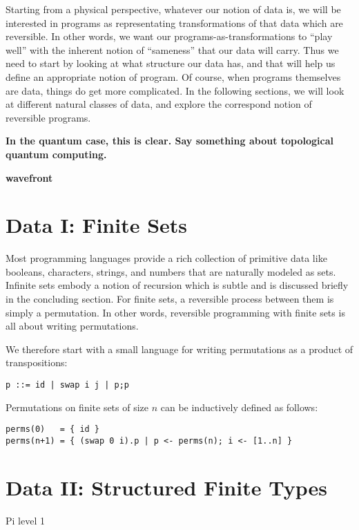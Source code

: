 \documentclass{article}
\newcommand{\amr}[1]{\fbox{Amr says:} \textbf{#1}}
\newcommand{\jc}[1]{\fbox{Jacques says:} \textbf{#1}}
\begin{document}
Starting from a physical perspective, whatever our notion of data
is, we will be interested in programs as representating transformations
of that data which are reversible. In other words, we want our
programs-as-transformations to ``play well'' with the inherent notion
of ``sameness'' that our data will carry. Thus we need to start by
looking at what structure our data has, and that will help us define
an appropriate notion of program. Of course, when programs themselves
are data, things do get more complicated.  In the following sections,
we will look at different natural classes of data, and explore the
correspond notion of reversible programs.

\amr{In the quantum case, this is clear. Say something about topological
quantum computing.}

\jc{wavefront}
\section{Data I: Finite Sets}

Most programming languages provide a rich collection of primitive
data like booleans, characters, strings, and numbers that are
naturally modeled as sets. Infinite sets embody a notion of recursion
which is subtle and is discussed briefly in the concluding
section. For finite sets, a reversible process between them is simply
a permutation. In other words, reversible programming with finite sets
is all about writing permutations. 

We therefore start with a small language for writing permutations as a
product of transpositions:

\begin{verbatim}
p ::= id | swap i j | p;p
\end{verbatim}

Permutations on finite sets of size $n$ can be inductively defined as
follows:
\begin{verbatim}
perms(0)   = { id }
perms(n+1) = { (swap 0 i).p | p <- perms(n); i <- [1..n] }  
\end{verbatim}

\section{Data II: Structured Finite Types}

Pi level 1
\end{document}
